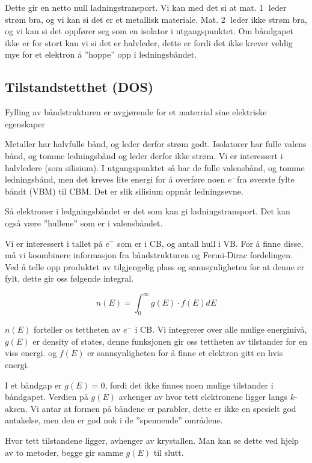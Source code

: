 Dette gir en netto null ladningstransport. Vi kan med det si at mat. \textcircled{1} leder strøm bra, og vi kan si det er et metallisk materiale. Mat. \textcircled{2} leder ikke strøm bra, og vi kan si det oppfører seg som en isolator i utgangspunktet. Om båndgapet ikke er for stort kan vi si det er halvleder, dette er fordi det ikke krever veldig mye for et elektron å ''hoppe'' opp i ledningsbåndet.

\subsection{Tilstandstetthet (DOS)}
\label{sec:tema6_3}
Fylling av båndstrukturen er avgjørende for et materrial sine elektriske egenskaper

Metaller har halvfulle bånd, og leder derfor strøm godt. Isolatorer har fulle valens bånd, og tomme ledningsbånd og leder derfor ikke strøm. Vi er interessert i halvledere (som silisium). I utgangspunktet så har de fulle valensbånd, og tomme ledningsbånd, men det kreves lite energi for å overføre noen $e^-$fra øverste fylte båndt (VBM) til CBM. Det er slik silisium oppnår ledningsevne.

Så elektroner i ledgningsbåndet er det som kan gi ladningstransport. Det kan også være ''hullene'' som er i valensbåndet.

Vi er interessert i tallet på $e^-$ som er i CB, og antall hull i VB. For å finne disse, må vi koombinere informasjon fra båndstrukturen og Fermi-Dirac fordelingen. Ved å telle opp produktet av tilgjengelig plass og sannsynligheten for at denne er fylt, dette gir oss følgende integral.

\begin{equation}
    n(E) = \int_{0}^{\infty} g(E) \cdot f(E) dE
\end{equation}

$n(E)$ forteller os tettheten av $e^-$ i CB. Vi integrerer over alle mulige energinivå, $g(E)$ er density of states, denne funksjonen gir oss tettheten av tilstander for en viss energi. og $f(E)$ er sannsynligheten for å finne et elektron gitt en hvis energi.

I et båndgap er $g(E)=0$, fordi det ikke finnes noen mulige tilstander i båndgapet. Verdien på $g(E)$ avhenger av hvor tett elektronene ligger langs $k$-aksen. Vi antar at formen på båndene er parabler, dette er ikke en spesielt god antakelse, men den er god nok i de ''spennende'' områdene. 

Hvor tett tilstandene ligger, avhenger av krystallen. Man kan se dette ved hjelp av to metoder, begge gir samme $g(E)$ til slutt.

